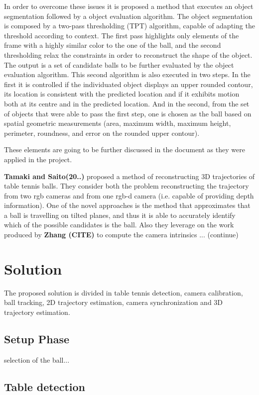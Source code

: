 \documentclass[a4paper]{article}
\begin{document}
In order to overcome these issues it is proposed a method that executes an object segmentation followed by a object evaluation algorithm. The object segmentation is composed by a two-pass thresholding (TPT) algorithm, capable of adapting the threshold according to context. The first pass highlights only elements of the frame with a highly similar color to the one of the ball, and the second thresholding relax the constraints in order to reconstruct the shape of the object. The output is a set of candidate balls to be further evaluated by the object evaluation algorithm. This second algorithm is also executed in two steps. In the first it is controlled if the individuated object displays an upper rounded contour, its location is consistent with the predicted location and if it exhibits motion both at its centre and in the predicted location. And in the second, from the set of objects that were able to pass the first step, one is chosen as the ball based on spatial geometric measurements (area, maximum width, maximum height, perimeter, roundness, and error on the rounded upper contour).

These elements are going to be further discussed in the document as they were applied in the project. 

\textbf{Tamaki and Saito(20..)} proposed a method of reconstructing 3D trajectories of table tennis balls. They consider both the problem reconstructing the trajectory from two rgb cameras and from one rgb-d camera (i.e. capable of providing depth information). One of the novel approaches is the method that approximates that a ball is travelling on tilted planes, and thus it is able to accurately identify which of the possible candidates is the ball. Also they leverage on the work produced by\textbf{ Zhang (CITE)} to compute the camera intrinsics ... (continue)


\section{Solution}

The proposed solution is divided in table tennis detection, camera calibration, ball tracking, 2D trajectory estimation, camera synchronization and 3D trajectory estimation. 

\subsection{Setup Phase}
	selection of the ball...

\subsection{Table detection}
\end{document}

